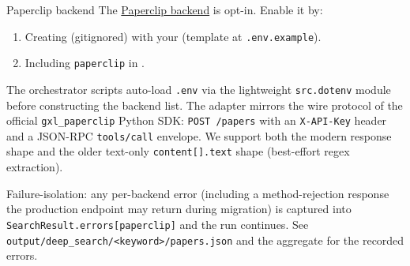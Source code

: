 \documentclass[
  ignorenonframetext,
]{beamer}
\providecommand{\tightlist}{%
  \setlength{\itemsep}{0pt}\setlength{\parskip}{0pt}}
\begin{document}
\begin{frame}{Paperclip backend}
\protect{}\label{paperclip-backend}
The \href{https://paperclip.gxl.ai}{Paperclip backend} is opt-in. Enable
it by:

\begin{enumerate}
\tightlist
\item
  Creating 
  (gitignored) with your  (template
  at \texttt{.env.example}).
\item
  Including \texttt{paperclip} in
  .
\end{enumerate}

The orchestrator scripts auto-load \texttt{.env} via the lightweight
\texttt{src.dotenv} module before constructing the backend list. The
 adapter mirrors the wire protocol of the
official \texttt{gxl\_paperclip} Python SDK: \texttt{POST\ /papers} with
an \texttt{X-API-Key} header and a JSON-RPC \texttt{tools/call}
envelope. We support both the modern 
response shape and the older text-only \texttt{content{[}{]}.text} shape
(best-effort regex extraction).

Failure-isolation: any per-backend error (including a method-rejection
response the production endpoint may return during migration) is
captured into \texttt{SearchResult.errors{[}paperclip{]}} and the run
continues. See
\texttt{output/deep\_search/\textless{}keyword\textgreater{}/papers.json}
and the aggregate  for the recorded errors.
\end{frame}
\end{document}
